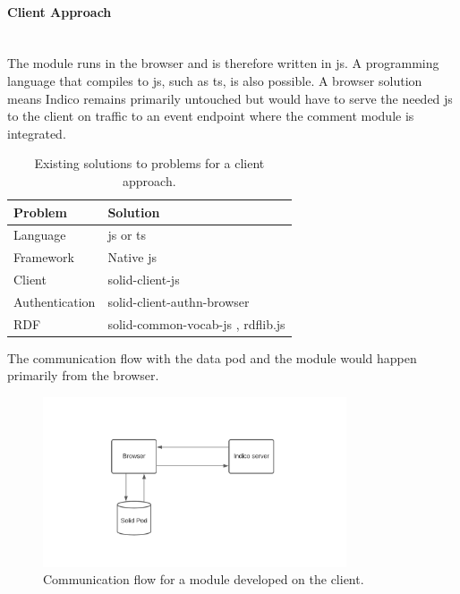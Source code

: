 \paragraph{Client Approach}\mbox{}\\

The module runs in the browser and is therefore written in \gls{js}. A programming language that compiles to \gls{js}, such as \gls{ts}, is also possible. A browser solution means Indico remains primarily untouched but would have to serve the needed \gls{js} to the client on traffic to an event endpoint where the comment module is integrated.

\begin{table}[h!]
    \centering
    \begin{tabular}{| l | l |} 
     \hline
     Problem & Solution \\
     \hline
      Language & \gls{js} or \gls{ts}  \\
      Framework & Native \gls{js}  \\
      Client & solid-client-js \cite{solid-client-js}  \\
      Authentication & solid-client-authn-browser \cite{solid-client-authn-browser} \\
      RDF & solid-common-vocab-js \cite{solid-common-vocab-js}, rdflib.js \cite{rdflib-js}  \\
     \hline
    \end{tabular}
    \vspace{0.75cm}
    \caption{Existing solutions to problems for a client approach.}
    \label{table:1}
\end{table}

The communication flow with the data pod and the module would happen primarily from the browser.

\begin{figure}[H]
    \centering
    \includegraphics[width=0.8\textwidth]{prototype/graphs/poc-infrastructure-frontend.jpeg}
    \caption{Communication flow for a module developed on the client.}
    \label{fig:poc-infrastructure-frontend}
\end{figure}
\vspace{0.5cm}
